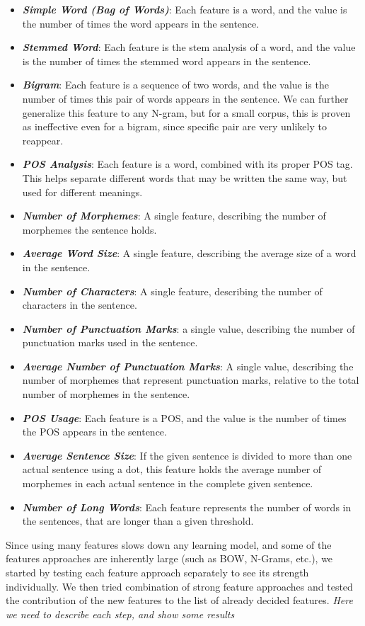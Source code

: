 \documentclass[a4paper]{article}
\begin{document}
\begin{itemize}
\item \textbf{\emph{Simple Word (Bag of Words)}}: Each feature is a word, and the value is the number of times the word appears in the sentence.
\item \textbf{\emph{Stemmed Word}}: Each feature is the stem analysis of a word, and the value is the number of times the stemmed word appears in the sentence.
\item \textbf{\emph{Bigram}}: Each feature is a sequence of two words, and the value is the number of times this pair of words appears in the sentence. We can further generalize this feature to any N-gram, but for a small corpus, this is proven as ineffective even for a bigram, since specific pair are very unlikely to reappear.
\item \textbf{\emph{POS Analysis}}: Each feature is a word, combined with its proper POS tag. This helps separate different words that may be written the same way, but used for different meanings.
\item \textbf{\emph{Number of Morphemes}}: A single feature, describing the number of morphemes the sentence holds.
\item \textbf{\emph{Average Word Size}}: A single feature, describing the average size of a word in the sentence.
\item \textbf{\emph{Number of Characters}}: A single feature, describing the number of characters in the sentence.
\item \textbf{\emph{Number of Punctuation Marks}}: a single value, describing the number of punctuation marks used in the sentence.
\item \textbf{\emph{Average Number of Punctuation Marks}}: A single value, describing the number of morphemes that represent punctuation marks, relative to the total number of morphemes in the sentence.
\item \textbf{\emph{POS Usage}}: Each feature is a POS, and the value is the number of times the POS appears in the sentence.
\item \textbf{\emph{Average Sentence Size}}: If the given sentence is divided to more than one actual sentence using a dot, this feature holds the average number of morphemes in each actual sentence in the complete given sentence.
\item \textbf{\emph{Number of Long Words}}: Each feature represents the number of words in the sentences, that are longer than a given threshold.
\end{itemize}
Since using many features slows down any learning model, and some of the features approaches are inherently large (such as BOW, N-Grams, etc.), we started by testing each feature approach separately to see its strength individually. We then tried combination of strong feature approaches and tested the contribution of the new features to the list of already decided features.
\emph{Here we need to describe each step, and show some results}
\end{document}
